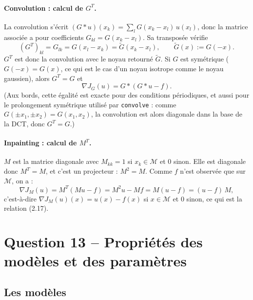 \documentclass[11pt,a4paper]{article}
\begin{document}
\paragraph{Convolution : calcul de $G^T$.}
La convolution s'écrit $(G*u)(x_k) = \sum_l G(x_k - x_l)\,u(x_l)$, donc la matrice associée a pour coefficients
$G_{kl} = G(x_k - x_l)$. Sa transposée vérifie
\[
  (G^{T})_{kl} = G_{lk} = G(x_l - x_k) = \tilde G(x_k - x_l), \qquad \tilde G(x) := G(-x).
\]
$G^T$ est donc la convolution avec le noyau retourné $\tilde G$. Si $G$ est symétrique ($G(-x)=G(x)$, ce qui est le cas
d'un noyau isotrope comme le noyau gaussien), alors $\boxed{G^T = G}$ et
\[
  \nabla J_G(u) = G*(G*u - f). \tag{2.16}
\]
(Aux bords, cette égalité est exacte pour des conditions périodiques, et aussi pour le prolongement symétrique
utilisé par \texttt{convolve} : comme $G(\pm x_1,\pm x_2)=G(x_1,x_2)$, la convolution est alors diagonale dans la base de
la DCT, donc $G^T=G$.)

\paragraph{Inpainting : calcul de $M^T$.}
$M$ est la matrice diagonale avec $M_{kk} = 1$ si $x_k\in\mathcal M$ et $0$ sinon. Elle est diagonale donc
$\boxed{M^T = M}$, et c'est un projecteur : $M^2 = M$. Comme $f$ n'est observée que sur $\mathcal M$, on a :
\[
  \nabla J_M(u) = M^T(Mu - f) = M^2 u - Mf = M(u - f) = (u-f)\,M,
\]
c'est-à-dire $\nabla J_M(u)(x) = u(x)-f(x)$ si $x\in\mathcal M$ et $0$ sinon, ce qui est la relation (2.17).

\section*{Question 13 -- Propriétés des modèles et des paramètres}

\subsection*{Les modèles}
\end{document}
